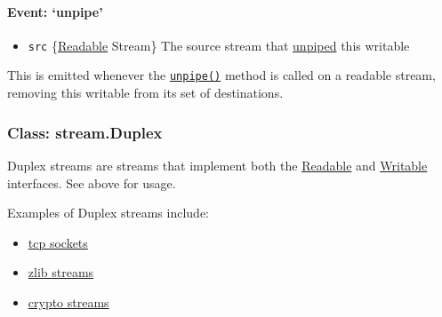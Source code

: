 \paragraph{Event: `unpipe'}

\begin{itemize}
\item
  \texttt{src} \{\hyperref[stream\_class\_stream\_readable]{Readable}
  Stream\} The source stream that
  \hyperref[stream\_readable\_unpipe\_destination]{unpiped} this
  writable
\end{itemize}

This is emitted whenever the
\hyperref[stream\_readable\_unpipe\_destination]{\texttt{unpipe()}}
method is called on a readable stream, removing this writable from its
set of destinations.

\begin{Shaded}
\begin{Highlighting}[]
 
 
\NormalTok{(}\NormalTok{, }
  \NormalTok{(}\NormalTok{);}
\NormalTok{\});}
\end{Highlighting}
\end{Shaded}

\subsubsection{Class: stream.Duplex}

Duplex streams are streams that implement both the
\hyperref[stream\_class\_stream\_readable]{Readable} and
\hyperref[stream\_class\_stream\_writable]{Writable} interfaces. See
above for usage.

Examples of Duplex streams include:

\begin{itemize}
\item
  \href{net.html\#net\_class\_net\_socket}{tcp sockets}
\item
  \href{zlib.html}{zlib streams}
\item
  \href{crypto.html}{crypto streams}
\end{itemize}

